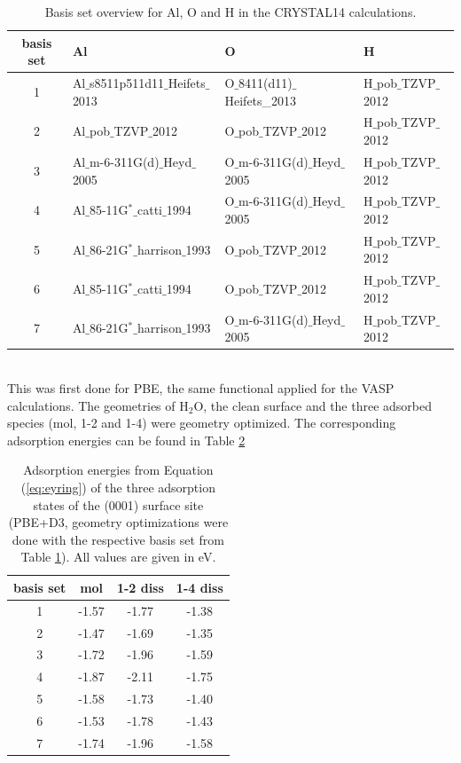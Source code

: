 \documentclass[11pt,DIV=13,BCOR=5mm,a4paper,headinclude]{scrbook}
\begin{document}
\begin{table}[!h]
  \centering
   \caption{Basis set overview for Al, O and H in the CRYSTAL14 calculations.}
  \begin{tabular}{c|lll}
  \toprule
  basis set & Al & O & H \\\midrule
   1&Al$\_$s8511p511d11$\_$Heifets$\_$2013 & O$\_$8411(d11)$\_$Heifets\_2013&H$\_$pob$\_$TZVP$\_$2012 \\
   2&Al$\_$pob$\_$TZVP$\_$2012 &O$\_$pob$\_$TZVP$\_$2012 & H$\_$pob$\_$TZVP$\_$2012\\
   3&Al$\_$m-6-311G(d)$\_$Heyd$\_$2005 &O$\_$m-6-311G(d)$\_$Heyd$\_$2005 & H$\_$pob$\_$TZVP$\_$2012\\
   4&Al$\_$85-11G$^\ast\_$catti$\_$1994 &O$\_$m-6-311G(d)$\_$Heyd$\_$2005 & H$\_$pob$\_$TZVP$\_$2012\\
   5&Al$\_$86-21G$^\ast\_$harrison$\_$1993 &O$\_$pob$\_$TZVP$\_$2012 & H$\_$pob$\_$TZVP$\_$2012\\
   6&Al$\_$85-11G$^\ast\_$catti$\_$1994 &O$\_$pob$\_$TZVP$\_$2012 & H$\_$pob$\_$TZVP$\_$2012\\
   7&Al$\_$86-21G$^\ast\_$harrison$\_$1993 &O$\_$m-6-311G(d)$\_$Heyd$\_$2005 & H$\_$pob$\_$TZVP$\_$2012\\\bottomrule
  \end{tabular}
  \label{tab:basissets}
\end{table}
 \\
This was first done for PBE, the same functional applied for the VASP calculations.
The geometries of H$_2$O, the clean surface and the three adsorbed species (mol, 1-2 and 1-4) were geometry optimized.
The corresponding adsorption energies can be found in Table \ref{tab:basisset-results-PBE+D3}
\begin{table}[!h]
  \centering
   \caption{Adsorption energies from Equation (\ref{eq:eyring}) of the three adsorption states of the (0001) surface site (PBE+D3, geometry optimizations were done with the respective basis set from Table \ref{tab:basissets}).
All values are given in eV.}
  \begin{tabular}{c|ccc}
  \toprule
  basis set & mol & 1-2 diss & 1-4 diss \\\midrule
  1 &-1.57 &-1.77 &-1.38 \\
  2 &-1.47 &-1.69 &-1.35 \\
  3 &-1.72 &-1.96 &-1.59 \\
  4 &-1.87 &-2.11 &-1.75 \\
  5 &-1.58 &-1.73 &-1.40 \\
  6 &-1.53 &-1.78 &-1.43 \\
  7 &-1.74 &-1.96 &-1.58 \\\bottomrule  
  \end{tabular}
  \label{tab:basisset-results-PBE+D3}
\end{table}
\end{document}
